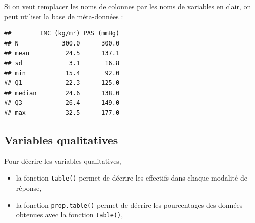 \documentclass[
]{book}
\newenvironment{Shaded}{\begin{snugshade}}{\end{snugshade}}
\newcommand{\AttributeTok}[1]{\textcolor[rgb]{0.13,0.29,0.53}{#1}}
\newcommand{\CommentTok}[1]{\textcolor[rgb]{0.56,0.35,0.01}{\textit{#1}}}
\newcommand{\DecValTok}[1]{\textcolor[rgb]{0.00,0.00,0.81}{#1}}
\newcommand{\FunctionTok}[1]{\textcolor[rgb]{0.13,0.29,0.53}{\textbf{#1}}}
\newcommand{\NormalTok}[1]{#1}
\newcommand{\OtherTok}[1]{\textcolor[rgb]{0.56,0.35,0.01}{#1}}
\newcommand{\SpecialCharTok}[1]{\textcolor[rgb]{0.81,0.36,0.00}{\textbf{#1}}}
\newcommand{\StringTok}[1]{\textcolor[rgb]{0.31,0.60,0.02}{#1}}
\providecommand{\tightlist}{%
  \setlength{\itemsep}{0pt}\setlength{\parskip}{0pt}}
\begin{document}
Si on veut remplacer les noms de colonnes par les noms de variables en clair, on peut utiliser la base de méta-données :

\begin{Shaded}
\end{Shaded}

\begin{verbatim}
##        IMC (kg/m²) PAS (mmHg)
## N            300.0      300.0
## mean          24.5      137.1
## sd             3.1       16.8
## min           15.4       92.0
## Q1            22.3      125.0
## median        24.6      138.0
## Q3            26.4      149.0
## max           32.5      177.0
\end{verbatim}

\subsection{Variables qualitatives}\label{variables-qualitatives-1}

Pour décrire les variables qualitatives,

\begin{itemize}
\tightlist
\item
  la fonction \texttt{table()} permet de décrire les effectifs dans chaque modalité de réponse,
\item
  la fonction \texttt{prop.table()} permet de décrire les pourcentages des données obtenues avec la fonction \texttt{table()},
\end{itemize}
\end{document}
